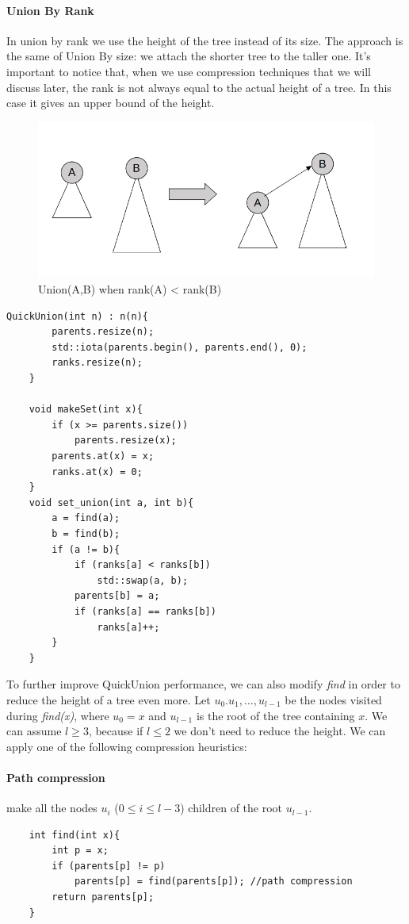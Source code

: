 \documentclass{article}
\begin{document}
\paragraph{Union By Rank} In union by rank we use the height of the tree instead
of its size. The approach is the same of Union By size: we attach the shorter tree
to the taller one. It's important to notice that, when we use compression techniques that we will discuss later, the rank is not always equal to the actual height of a tree. 
In this case it gives an upper bound of the height.  
\begin{figure}[h!]
    \includegraphics[width=0.9\linewidth]{img/urank.png}
    \caption{Union(A,B) when rank(A) < rank(B)}
    \label{fig:urank}
\end{figure}
\begin{lstlisting}[caption=QuickUnion using Union by Rank]
    QuickUnion(int n) : n(n){
        parents.resize(n);
        std::iota(parents.begin(), parents.end(), 0);
        ranks.resize(n);
    }

    void makeSet(int x){
        if (x >= parents.size())
            parents.resize(x);
        parents.at(x) = x;
        ranks.at(x) = 0;
    }
    void set_union(int a, int b){
        a = find(a);
        b = find(b);
        if (a != b){
            if (ranks[a] < ranks[b])
                std::swap(a, b);
            parents[b] = a;
            if (ranks[a] == ranks[b])
                ranks[a]++;
        }
    }
\end{lstlisting}
To further improve QuickUnion performance, we can also modify \emph{find} in order to reduce the height of a tree
even more. Let $u_0. u_1, \dots, u_{l-1}$ be the nodes visited during \emph{find(x)}, where $u_0 = x$ and $u_{l-1}$ is
the root of the tree containing $x$. We can assume $l \geq 3$, because if $l\leq 2$ we don't need to reduce the height.
We can apply one of the following compression heuristics:
\paragraph{Path compression}  make all the nodes $u_i$ ($ 0 \leq i \leq l-3$) children of the root $u_{l-1}$\cite{hopcroft1973set}.
\begin{lstlisting}
    int find(int x){
        int p = x;
        if (parents[p] != p)
            parents[p] = find(parents[p]); //path compression
        return parents[p];
    }
\end{lstlisting}
\end{document}
